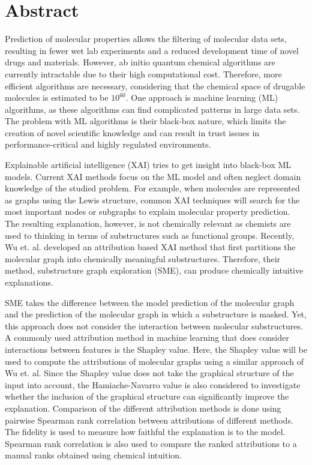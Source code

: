 \chapter{Abstract}


Prediction of molecular properties allows the filtering of molecular data sets, 
resulting in fewer wet lab experiments and a reduced development time of novel 
drugs and materials.\cite{adelusi2022molecular} However, ab initio quantum chemical algorithms are currently 
intractable due to their high computational cost.\cite{szabo2012modern} Therefore, more efficient 
algorithms are necessary, considering that the chemical space of drugable molecules 
is estimated to be $10^{60}$. One approach is machine learning (ML) algorithms, as these 
algorithms can find complicated patterns in large data sets.\cite{gorgulla2022emerging} The problem with ML 
algorithms is their black-box nature, which limits the creation of novel scientific 
knowledge and can result in trust issues in performance-critical and highly regulated 
environments.\cite{carvalho2019machine}


Explainable artificial intelligence (XAI) tries to get insight into black-box 
ML models.\cite{carvalho2019machine, yuan2022explainability} 
Current XAI methods focus on the ML model and often neglect domain 
knowledge of the studied problem. For example, when molecules are represented 
as graphs using the Lewis structure\cite{ahmad1992drawing}, common XAI techniques will search for the 
most important nodes or subgraphs to explain molecular property prediction.\cite{wu2023chemistry} The 
resulting explanation, however, is not chemically relevant as chemists are used 
to thinking in terms of substructures such as functional groups. Recently, Wu et. 
al. developed an attribution based XAI method that first partitions the molecular graph into 
chemically meaningful substructures. Therefore, their method, substructure graph 
exploration (SME), can produce chemically intuitive explanations.\cite{wu2023chemistry}


SME takes the difference between the model prediction of the molecular graph and 
the prediction of the molecular graph in which a substructure is masked. Yet, 
this approach does not consider the interaction between molecular substructures.
A commonly used attribution method in machine learning that does consider 
interactions between features is the Shapley value. Here, the Shapley value\cite{shapley1953value} will 
be used to compute the attributions of molecular graphs using a similar approach 
of Wu et. al. Since the Shapley value does not take the graphical structure of 
the input into account, the Hamiache-Navarro value\cite{hamiache_value_1999} 
is also considered to investigate whether the inclusion of the graphical structure 
can significantly improve the explanation. Comparison of the different attribution 
methods is done using pairwise Spearman rank correlation between attributions of 
different methods. The fidelity\cite{carvalho2019machine} is used to measure 
how faithful the explanation is to the model. Spearman rank correlation is also 
used to compare the ranked attributions to a manual ranks obtained using chemical 
intuition. 


